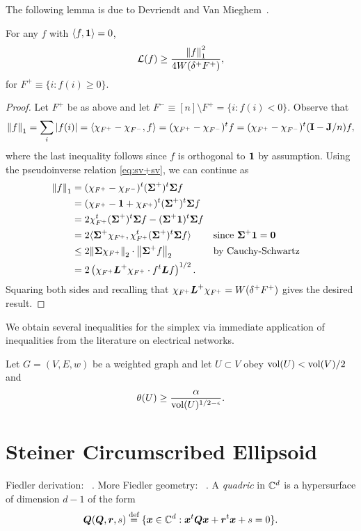 The following lemma is due to Devriendt and Van Mieghem~\cite{devriendt2018simplex}. 


\begin{lemma}
For any $f$ with $\langle f,\vb{1}\rangle=0$, \begin{equation*}
    \mathcal{L}(f) \geq \frac{\norm{f}_1^2}{4W(\delta^+F^+)},
\end{equation*}
for $F^+\equiv \{i:f(i)\geq 0\}$. 
\end{lemma}
\begin{proof}
Let $F^+$ be as above and let $F^-\equiv [n]\setminus F^+=\{i:f(i)<0\}$. Observe that 
\begin{equation*}
    \norm{f}_1=\sum_i |f(i)| = \langle \chi_{F^+}-\chi_{F^-},f\rangle = (\chi_{F^+}-\chi_{F^-})^t f = (\chi_{F^+}-\chi_{F^-})^t(\vb{I}-\vb{J}/n) f,
\end{equation*}
where the last inequality follows since $f$ is orthogonal to $\vb{1}$ by assumption. Using the pseudoinverse relation \eqref{eq:sv+sv}, we can continue as 
\begin{align*}
    \norm{f}_1 &= (\chi_{F^+}-\chi_{F^-})^t(\boldsymbol{\Sigma}^+)^t \boldsymbol{\Sigma} f \\
    &= (\chi_{F^+}-\vb{1} + \chi_{F^+})^t(\boldsymbol{\Sigma}^+)^t \boldsymbol{\Sigma} f \\
    &=2\chi_{F^+}^t (\boldsymbol{\Sigma}^+)^t \boldsymbol{\Sigma} f - (\boldsymbol{\Sigma}^+\vb{1})^t \boldsymbol{\Sigma} f \\
    &= 2\langle \boldsymbol{\Sigma}^+\chi_{F^+}, \chi_{F^+}^t (\boldsymbol{\Sigma}^+)^t \boldsymbol{\Sigma} f \rangle &&\text{since }\boldsymbol{\Sigma}^+\vb{1} =\vb{0}\\
    &\leq 2\norm{\boldsymbol{\Sigma}\chi_{F^+}}_2 \cdot \norm{\boldsymbol{\Sigma}^+ f}_2 &&\text{by Cauchy-Schwartz}\\
    &= 2\left(\chi_{F^+}\vb*{L}^+\chi_{F^+}\cdot f^t \vb*{L} f\right)^{1/2}.
\end{align*}
Squaring both sides and recalling that $\chi_{F^+}\vb*{L}^+\chi_{F^+} = W(\delta^+F^+)$ gives the desired result. 
\end{proof}

We obtain several inequalities for the simplex via immediate application of inequalities from the literature on electrical networks. 

\begin{lemma}
Let $G=(V,E,w)$ be a weighted graph and let $U\subset V$ obey $\textnormal{vol}(U)<\textnormal{vol}(V)/2$ and \[\theta(U) \geq \frac{\alpha}{\textnormal{vol}(U)^{1/2-\epsilon}}.\]
\end{lemma}

\section{Steiner Circumscribed Ellipsoid}
Fiedler derivation: ~\cite{fiedler2005geometry}. More Fiedler geometry: ~\cite{fiedler1993geometric}. 
A \emph{quadric} in $\mathbb{C}^d$ is a hypersurface of dimension $d-1$ of the form 
\begin{equation*}
    \vb*{{Q}}(\vb*{Q},\vb*{r},s) \overset{\text{def}}{=} \{\vb*{x}\in\mathbb{C}^d: \vb*{x}^t \vb*{Q}\vb*{x} + \vb*{r}^t \vb*{x} + s=0\}.
\end{equation*}

